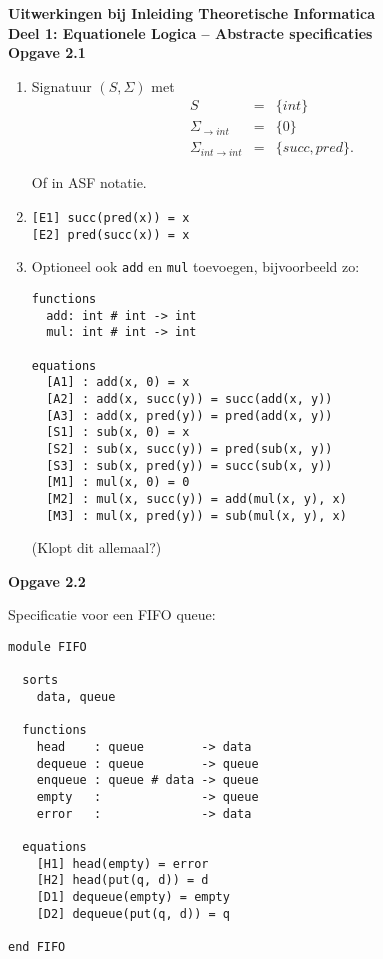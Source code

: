 \documentclass[a4paper,11pt]{article}
\begin{document}
{\bf Uitwerkingen bij Inleiding Theoretische Informatica\\
Deel 1: Equationele Logica -- Abstracte specificaties}\\[2em]


{\bf Opgave 2.1}

\begin{enumerate}

\item %
Signatuur $(S, \Sigma)$ met
\begin{eqnarray*}
S & = & \{int\} \\
\Sigma_{\rightarrow int} & = & \{0\} \\
\Sigma_{int \rightarrow int} & = & \{succ, pred\}.
\end{eqnarray*}

Of in ASF notatie.

\item %
\begin{verbatim}
[E1] succ(pred(x)) = x
[E2] pred(succ(x)) = x
\end{verbatim}

\item %
Optioneel ook \verb|add| en \verb|mul| toevoegen, bijvoorbeeld zo:

\begin{verbatim}
functions
  add: int # int -> int
  mul: int # int -> int

equations
  [A1] : add(x, 0) = x
  [A2] : add(x, succ(y)) = succ(add(x, y))
  [A3] : add(x, pred(y)) = pred(add(x, y))
  [S1] : sub(x, 0) = x
  [S2] : sub(x, succ(y)) = pred(sub(x, y))
  [S3] : sub(x, pred(y)) = succ(sub(x, y))
  [M1] : mul(x, 0) = 0
  [M2] : mul(x, succ(y)) = add(mul(x, y), x)
  [M3] : mul(x, pred(y)) = sub(mul(x, y), x)
\end{verbatim}

(Klopt dit allemaal?)

\end{enumerate}


{\bf Opgave 2.2} %

Specificatie voor een FIFO queue:

\begin{verbatim}
module FIFO

  sorts
    data, queue

  functions
    head    : queue        -> data
    dequeue : queue        -> queue
    enqueue : queue # data -> queue
    empty   :              -> queue
    error   :              -> data

  equations
    [H1] head(empty) = error
    [H2] head(put(q, d)) = d
    [D1] dequeue(empty) = empty
    [D2] dequeue(put(q, d)) = q

end FIFO
\end{verbatim}
\end{document}
